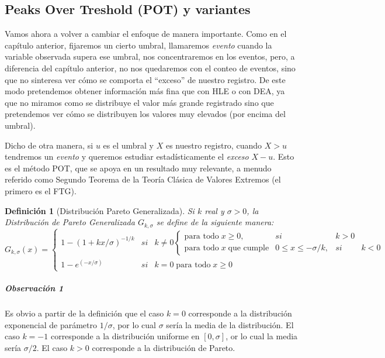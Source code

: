 \documentclass[
  12pt]{article}
\newtheorem{definition}{Definición}[section]
\begin{document}
\newpage

\subsection{Peaks Over Treshold (POT) y
variantes}\label{peaks-over-treshold-pot-y-variantes}

Vamos ahora a volver a cambiar el enfoque de manera importante. Como en
el capítulo anterior, fijaremos un cierto umbral, llamaremos
\emph{evento} cuando la variable observada supera ese umbral, nos
concentraremos en los eventos, pero, a diferencia del capítulo anterior,
no nos quedaremos con el conteo de eventos, sino que no sinteresa ver
cómo se comporta el ``exceso'' de nuestro registro. De este modo
pretendemos obtener información más fina que con HLE o con DEA, ya que
no miramos como se distribuye el valor más grande registrado sino que
pretendemos ver cómo se distribuyen los valores muy elevados (por encima
del umbral).

Dicho de otra manera, si \(u\) es el umbral y \(X\) es nuestro registro,
cuando \(X>u\) tendremos un \emph{evento} y queremos estudiar
estadísticamente el \emph{exceso} \(X-u\). Esto es el método POT, que se
apoya en un resultado muy relevante, a menudo referido como Segundo
Teorema de la Teoría Clásica de Valores Extremos (el primero es el FTG).

\begin{definition}[Distribución Pareto Generalizada]
Si $k$ real y $\sigma>0$, la Distribución de Pareto Generalizada $G_{k,\sigma}$ se define de la siguiente manera:\\
\begin{equation}
G_{k,\sigma}(x)=\left\{\begin{matrix}
 1-(1+kx/\sigma)^{-1/k}& si & k\neq 0 \left\{\begin{matrix}
\text{para todo} \;x\geq 0 , & si & k>0\\ 
\text{para todo}\; x \;\text{que cumple}&
0\leq x \leq  -\sigma/k, &si& k<0
\end{matrix}\right.\\ 
 1-e^{(-x/\sigma)} & si& k =0\; \text{para todo}\; x\geq 0
\end{matrix}\right. 
\end{equation}
\end{definition}

\subparagraph{Observación 1}\label{observaciuxf3n-1}

Es obvio a partir de la definición que el caso \(k=0\) corresponde a la
distribución exponencial de parámetro \(1/\sigma\), por lo cual
\(\sigma\) sería la media de la distribución. El caso \(k=-1\)
corresponde a la distribución uniforme en \([0, \sigma]\), or lo cual la
media sería \(\sigma/2\). El caso \(k>0\) corresponde a la distribución
de Pareto.
\end{document}

